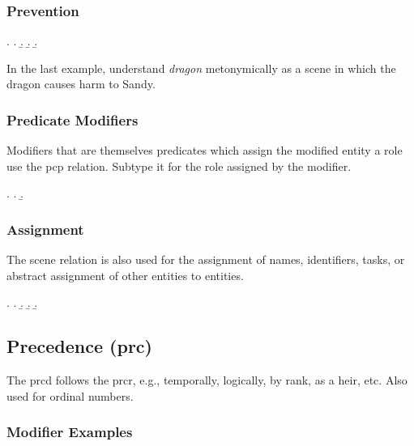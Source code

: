 \documentclass[a4paper]{article}
\begin{document}
\subsubsection{Prevention}

\ex. \a. 
     \b. 
     \b. 
     \b. 

In the last example, understand \emph{dragon} metonymically as a scene in which
the dragon causes harm to Sandy.

\subsubsection{Predicate Modifiers}

Modifiers that are themselves predicates which assign the modified entity a
role use the \textsf{pcp} relation. Subtype it for the role assigned by the
modifier.

\ex.
\a. 
\b. 

\subsubsection{Assignment}

The scene relation is also used for the assignment of names, identifiers,
tasks, or abstract assignment of other entities to entities.

\ex.
\a. 
\b. 
\b. 
\b. 


\clearpage
\subsection{Precedence (\textsf{prc})}
\label{sec:prc}

The \textsf{prcd} follows the \textsf{prcr}, e.g., temporally, logically, by
rank, as a heir, etc. Also used for ordinal numbers.

\subsubsection{Modifier Examples}
\end{document}
